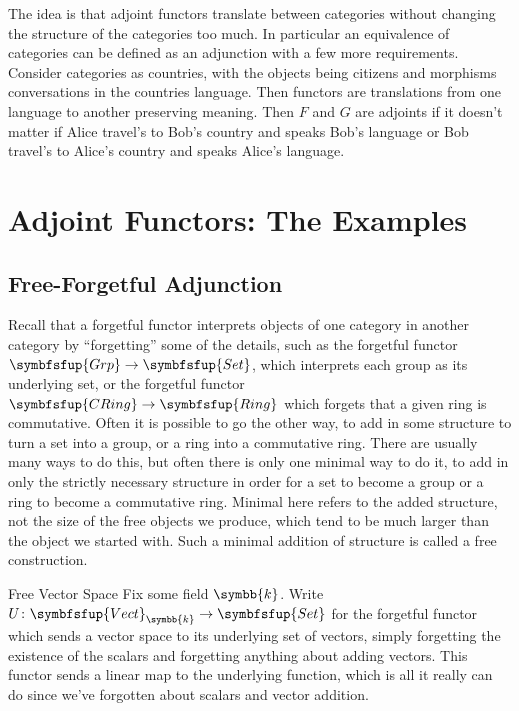 \documentclass[fleqn]{NotesClass}
\makeatletter
\newcommand{\c@egory}[1]{\symbfsfup{#1}}
\newcommand{\Set}{\c@egory{Set}}
\renewcommand{\field}{\symbb{k}}
\newcommand{\Vect}[1][\field]{{\c@egory{Vect}_{#1}}}
\newcommand{\Grp}{\c@egory{Grp}}
\newcommand{\Ring}{\c@egory{Ring}}
\newcommand{\CRing}{\c@egory{CRing}}
\makeatother
\begin{document}
\begin{appendices}
        The idea is that adjoint functors translate between categories without changing the structure of the categories too much.
        In particular an equivalence of categories can be defined as an adjunction with a few more requirements.
        Consider categories as countries, with the objects being citizens and morphisms conversations in the countries language.
        Then functors are translations from one language to another preserving meaning.
        Then \(F\) and \(G\) are adjoints if it doesn't matter if Alice travel's to Bob's country and speaks Bob's language or Bob travel's to Alice's country and speaks Alice's language.
        
        \section{Adjoint Functors: The Examples}
        \subsection{Free-Forgetful Adjunction}
        Recall that a forgetful functor interprets objects of one category in another category by \enquote{forgetting} some of the details, such as the forgetful functor \(\Grp \to \Set\), which interprets each group as its underlying set, or the forgetful functor \(\CRing \to \Ring\) which forgets that a given ring is commutative.
        Often it is possible to go the other way, to add in some structure to turn a set into a group, or a ring into a commutative ring.
        There are usually many ways to do this, but often there is only one minimal way to do it, to add in only the strictly necessary structure in order for a set to become a group or a ring to become a commutative ring.
        Minimal here refers to the added structure, not the size of the free objects we produce, which tend to be much larger than the object we started with.
        Such a minimal addition of structure is called a free construction.
        
        \begin{exm}{Free Vector Space}{}
            Fix some field \(\field\).
            Write \(U \colon \Vect \to \Set\) for the forgetful functor which sends a vector space to its underlying set of vectors, simply forgetting the existence of the scalars and forgetting anything about adding vectors.
            This functor sends a linear map to the underlying function, which is all it really can do since we've forgotten about scalars and vector addition.
            

\end{exm}
\end{appendices}
\end{document}
